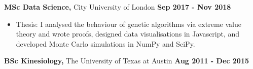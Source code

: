 \documentclass [
        11pt
] {article}
\begin{document}
\vspace*{10pt}

\noindent \textbf {MSc Data Science,} City University of London
\hspace*{\fill} \textbf{Sep 2017 - Nov 2018}

\begin{itemize}[noitemsep,topsep=0pt]
\renewcommand{\labelitemi}{\scriptsize$\blacksquare$}
\item Thesis: I analysed the behaviour of genetic algorithms via extreme value
theory and wrote proofs, designed data visualisations in Javascript, and developed 
Monte Carlo simulations in NumPy and SciPy.
\end{itemize}

\noindent \textbf {BSc Kinesiology,} The University of Texas at Austin
\hspace*{\fill} \textbf{Aug 2011 - Dec 2015}
\end{document}
